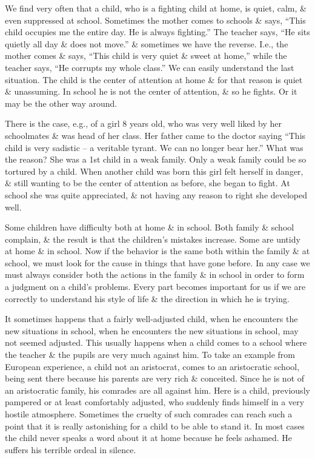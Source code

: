 \documentclass{article}
\begin{document}
We find very often that a child, who is a fighting child at home, is quiet, calm, \& even suppressed at school. Sometimes the mother comes to schools \& says, ``This child occupies me the entire day. He is always fighting.'' The teacher says, ``He sits quietly all day \& does not move.'' \& sometimes we have the reverse. I.e., the mother comes \& says, ``This child is very quiet \& sweet at home,'' while the teacher says, ``He corrupts my whole class.'' We can easily understand the last situation. The child is the center of attention at home \& for that reason is quiet \& unassuming. In school he is not the center of attention, \& so he fights. Or it may be the other way around.

There is the case, e.g., of a girl 8 years old, who was very well liked by her schoolmates \& was head of her class. Her father came to the doctor saying ``This child is very sadistic -- a veritable tyrant. We can no longer bear her.'' What was the reason? She was a 1st child in a weak family. Only a weak family could be so tortured by a child. When another child was born this girl felt herself in danger, \& still wanting to be the center of attention as before, she began to fight. At school she was quite appreciated, \& not having any reason to right she developed well.

Some children have difficulty both at home \& in school. Both family \& school complain, \& the result is that the children's mistakes increase. Some are untidy at home \& in school. Now if the behavior is the same both within the family \& at school, we must look for the cause in things that have gone before. In any case we must always consider both the actions in the family \& in school in order to form a judgment on a child's problems. Every part becomes important for us if we are correctly to understand his style of life \& the direction in which he is trying.

It sometimes happens that a fairly well-adjusted child, when he encounters the new situations in school, when he encounters the new situations in school, may not seemed adjusted. This usually happens when a child comes to a school where the teacher \& the pupils are very much against him. To take an example from European experience, a child not an aristocrat, comes to an aristocratic school, being sent there because his parents are very rich \& conceited. Since he is not of an aristocratic family, his comrades are all against him. Here is a child, previously pampered or at least comfortably adjusted, who suddenly finds himself in a very hostile atmosphere. Sometimes the cruelty of such comrades can reach such a point that it is really astonishing for a child to be able to stand it. In most cases the child never speaks a word about it at home because he feels ashamed. He suffers his terrible ordeal in silence.
\end{document}
